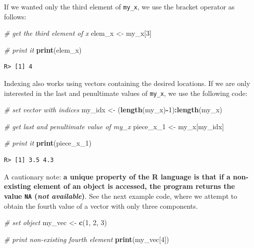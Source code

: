 \documentclass[
  12pt,
]{book}
\newenvironment{Shaded}{\begin{snugshade}}{\end{snugshade}}
\newcommand{\CommentTok}[1]{\textcolor[rgb]{0.37,0.37,0.37}{\textit{#1}}}
\newcommand{\DecValTok}[1]{\textcolor[rgb]{0.06,0.06,0.06}{#1}}
\newcommand{\KeywordTok}[1]{\textcolor[rgb]{0.27,0.27,0.27}{\textbf{#1}}}
\newcommand{\NormalTok}[1]{#1}
\newcommand{\OperatorTok}[1]{\textcolor[rgb]{0.43,0.43,0.43}{\textbf{#1}}}
\newcommand{\StringTok}[1]{\textcolor[rgb]{0.5,0.5,0.5}{#1}}
\begin{document}
If we wanted only the third element of \texttt{my\_x}, we use the bracket operator as follows:

\begin{Shaded}
\begin{Highlighting}[]
\CommentTok{# get the third element of x}
\NormalTok{elem_x <-}\StringTok{ }\NormalTok{my_x[}\DecValTok{3}\NormalTok{]}

\CommentTok{# print it}
\KeywordTok{print}\NormalTok{(elem_x)}
\end{Highlighting}
\end{Shaded}

\begin{verbatim}
R> [1] 4
\end{verbatim}

Indexing also works using vectors containing the desired locations. If we are only interested in the last and penultimate values of \texttt{my\_x}, we use the following code:

\begin{Shaded}
\begin{Highlighting}[]
\CommentTok{# set vector with indices}
\NormalTok{my_idx <-}\StringTok{  }\NormalTok{(}\KeywordTok{length}\NormalTok{(my_x)}\OperatorTok{-}\DecValTok{1}\NormalTok{)}\OperatorTok{:}\KeywordTok{length}\NormalTok{(my_x) }

\CommentTok{# get last and penultimate value of my_x}
\NormalTok{piece_x_}\DecValTok{1}\NormalTok{ <-}\StringTok{ }\NormalTok{my_x[my_idx]}

\CommentTok{# print it}
\KeywordTok{print}\NormalTok{(piece_x_}\DecValTok{1}\NormalTok{)}
\end{Highlighting}
\end{Shaded}

\begin{verbatim}
R> [1] 3.5 4.3
\end{verbatim}

A cautionary note: \textbf{a unique property of the R language is that if a non-existing element of an object is accessed, the program returns the value \texttt{NA} (\emph{not available})}. See the next example code, where we attempt to obtain the fourth value of a vector with only three components.

\begin{Shaded}
\begin{Highlighting}[]
\CommentTok{# set object}
\NormalTok{my_vec <-}\StringTok{ }\KeywordTok{c}\NormalTok{(}\DecValTok{1}\NormalTok{, }\DecValTok{2}\NormalTok{, }\DecValTok{3}\NormalTok{)}

\CommentTok{# print non-existing fourth element}
\KeywordTok{print}\NormalTok{(my_vec[}\DecValTok{4}\NormalTok{])}
\end{Highlighting}
\end{Shaded}
\end{document}

